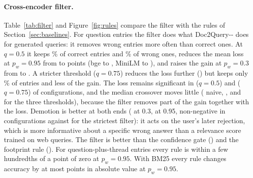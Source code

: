 \documentclass[11pt]{article}
\begin{document}
\paragraph{Cross-encoder filter.} Table~\ref{tab:filter} and Figure~\ref{fig:rules} compare the filter with the rules of Section~\ref{sec:baselines}. For question entries the filter does what Doc2Query-{}-{} does for generated queries: it removes wrong entries more often than correct ones. At $q=0.5$ it keeps \tKeptCAskFltH\% of correct entries and \tKeptWAskFltH\% of wrong ones, reduces the mean loss at $p_w=0.95$ from \tFAskNaive{} to \tFAskFltH{} points (bge \tNaiveBge{} to \tFltBge, MiniLM \tNaiveMini{} to \tFltMini), and raises the gain at $p_w=0.3$ from \tTAskNaive{} to \tTAskFltH. A stricter threshold ($q=0.75$) reduces the loss further (\tFAskFltT) but keeps only \tKeptAskFltT\% of entries and less of the gain. The loss remains significant in \tNegAskFltH{} ($q=0.5$) and \tNegAskFltT{} ($q=0.75$) of \nDenseT{} configurations, and the median crossover moves little (\tMedAskNaive{} naive, \tMedAskFltQ, \tMedAskFltH{} and \tMedAskFltT{} for the three thresholds), because the filter removes part of the gain together with the loss. Demotion is better at both ends (\tTAskDem{} at 0.3, \tFAskDem{} at 0.95, non-negative in \tNNAskDem{} configurations against \tNNAskFltT{} for the strictest filter): it acts on the user's later rejection, which is more informative about a specific wrong answer than a relevance score trained on web queries. The filter is better than the confidence gate (\tFAskGate) and the footprint rule (\tFAskFoot). For question-plus-thread entries every rule is within a few hundredths of a point of zero at $p_w=0.95$. With BM25 every rule changes accuracy by at most \tBmFltMaxAbs{} points in absolute value at $p_w=0.95$.

\begin{table}[t]\centering\scriptsize

\caption{Stored questions served as a semantic cache, CQADupStack, mean over twelve forums. $\tau$: similarity threshold (the $q$-quantile of each ask's similarity to its nearest other ask; BM25 scores are unnormalised). Hit rate: share of asks answered from the cache and hit precision: share of cache hits that are correct, both at $p_w=0.95$. $\Delta$: paired change in top-1 accuracy (points). The naive rows repeat ordinary write-back with question entries for comparison. Base top-1 accuracy: bge \cBaseBge\%, MiniLM \cBaseMini\%, BM25 \cBaseBm\%.}
\label{tab:cache}
\end{table}
\end{document}

